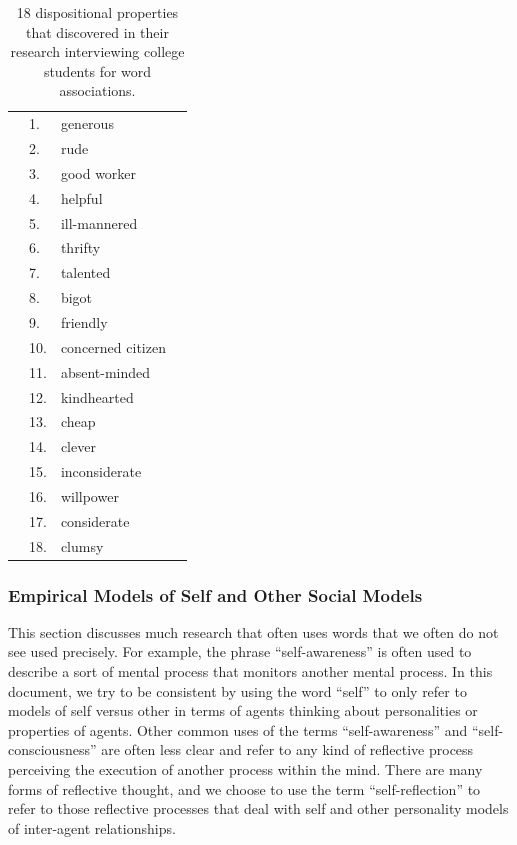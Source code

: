 \begin{table}
  \myfloatalign
  \begin{tabularx}{\textwidth}{XllX}
    & 1.  & generous          & \\
    & 2.  & rude              & \\
    & 3.  & good worker       & \\
    & 4.  & helpful           & \\
    & 5.  & ill-mannered      & \\
    & 6.  & thrifty           & \\
    & 7.  & talented          & \\
    & 8.  & bigot             & \\
    & 9.  & friendly          & \\
    & 10. & concerned citizen & \\
    & 11. & absent-minded     & \\
    & 12. & kindhearted       & \\
    & 13. & cheap             & \\
    & 14. & clever            & \\
    & 15. & inconsiderate     & \\
    & 16. & willpower         & \\
    & 17. & considerate       & \\
    & 18. & clumsy            & 
  \end{tabularx}
  \caption[18 dispositional properties]{18 dispositional properties
    that  discovered in their research
    interviewing college students for word associations.}
  \label{tab:winter_dispositional_properties}
\end{table}


\subsubsection{Empirical Models of Self and Other Social Models}

This section discusses much research that often uses words that we often do not see used precisely.
For example, the phrase ``self-awareness'' is often used to describe a sort of mental process that monitors another mental process.
In this document, we try to be consistent by using the word ``self'' to only refer to models of self versus other in terms of agents thinking about personalities or properties of agents.
Other common uses of the terms ``self-awareness'' and ``self-consciousness'' are often less clear and refer to any kind of reflective process perceiving the execution of another process within the mind.
There are many forms of reflective thought, and we choose to use the term ``self-reflection'' to refer to those reflective processes that deal with self and other personality models of inter-agent relationships.

